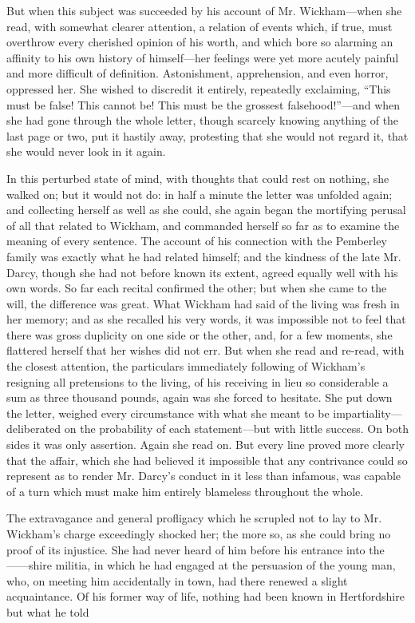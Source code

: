 \documentclass[12pt,openright]{book}
\begin{document}
But when this subject was succeeded by his account of Mr. Wickham—when she read, with somewhat clearer attention, a relation of events which, if true, must overthrow every cherished opinion of his worth, and which bore so alarming an affinity to his own history of himself—her feelings were yet more acutely painful and more difficult of definition. Astonishment, apprehension, and even horror, oppressed her. She wished to discredit it entirely, repeatedly exclaiming, “This must be false! This cannot be! This must be the grossest falsehood!”—and when she had gone through the whole letter, though scarcely knowing anything of the last page or two, put it hastily away, protesting that she would not regard it, that she would never look in it again.

In this perturbed state of mind, with thoughts that could rest on nothing, she walked on; but it would not do: in half a minute the letter was unfolded again; and collecting herself as well as she could, she again began the mortifying perusal of all that related to Wickham, and commanded herself so far as to examine the meaning of every sentence. The account of his connection with the Pemberley family was exactly what he had related himself; and the kindness of the late Mr. Darcy, though she had not before known its extent, agreed equally well with his own words. So far each recital confirmed the other; but when she came to the will, the difference was great. What Wickham had said of the living was fresh in her memory; and as she recalled his very words, it was impossible not to feel that there was gross duplicity on one side or the other, and, for a few moments, she flattered herself that her wishes did not err. But when she read and re-read, with the closest attention, the particulars immediately following of Wickham’s resigning all pretensions to the living, of his receiving in lieu so considerable a sum as three thousand pounds, again was she forced to hesitate. She put down the letter, weighed every circumstance with what she meant to be impartiality—deliberated on the probability of each statement—but with little success. On both sides it was only assertion. Again she read on. But every line proved more clearly that the affair, which she had believed it impossible that any contrivance could so represent as to render Mr. Darcy’s conduct in it less than infamous, was capable of a turn which must make him entirely blameless throughout the whole.

The extravagance and general profligacy which he scrupled not to lay to Mr. Wickham’s charge exceedingly shocked her; the more so, as she could bring no proof of its injustice. She had never heard of him before his entrance into the ——shire militia, in which he had engaged at the persuasion of the young man, who, on meeting him accidentally in town, had there renewed a slight acquaintance. Of his former way of life, nothing had been known in Hertfordshire but what he told
\end{document}

